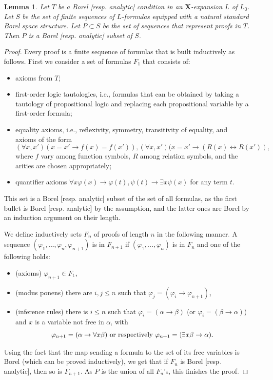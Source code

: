 \documentclass[12pt]{amsart}
\newtheorem{lemma}[theorem]{Lemma}
\begin{document}
\begin{lemma}\label{lemma:set_of_proofs_is_Borel}
    Let $T$ be a Borel [resp. analytic] condition in an $\mathbf{X}$-expansion $L$ of $L_0$. Let $S$ be the set of finite sequences of $L$-formulas equipped with a natural standard Borel space structure. Let $P \subset S$ be the set of sequences that represent proofs in $T$. Then $P$ is a Borel [resp. analytic] subset of $S$.
\end{lemma}
\begin{proof}
    Every proof is a finite sequence of formulas that is built inductively as follows. First we consider a set of formulas $F_1$ that consists of:
    \begin{itemize}
        \item axioms from $T$;
        \item first-order logic tautologies, i.e., formulas that can be obtained by taking a tautology of propositional logic and replacing each propositional variable by a first-order formula;
        \item equality axioms, i.e., reflexivity, symmetry, transitivity of equality, and axioms of the form 
        \[ (\forall x,x')(x=x' \rightarrow f(x)=f(x')), (\forall x,x')(x=x' \rightarrow (R(x) \leftrightarrow R(x')),\]
        where $f$ vary among function symbols, $R$ among relation symbols, and the arities are chosen appropriately;
        \item quantifier axioms $\forall x \varphi(x) \rightarrow \varphi(t), \psi(t) \rightarrow \exists x \psi(x)$ for any term $t$.
    \end{itemize}
    This set is a Borel [resp. analytic] subset of the set of all formulas, as the first bullet is Borel [resp. analytic] by the assumption, and the latter ones are Borel by an induction argument on their length.
  
    We define inductively sets $F_n$ of proofs of length $n$ in the following manner. A sequence $(\varphi_1, \dots, \varphi_n, \varphi_{n+1})$ is in $F_{n+1}$ if $(\varphi_1, \dots, \varphi_n)$ is in $F_n$ and one of the following holds:
    \begin{itemize}
        \item (axioms) $\varphi_{n+1} \in F_1$,
        \item (modus ponens) there are $i, j \leq n$ such that $\varphi_j = (\varphi_i \rightarrow \varphi_{n+1})$,
        \item (inference rules) there is $i \leq n$ such that $\varphi_i = (\alpha \rightarrow \beta)$ (or $\varphi_i = (\beta \rightarrow \alpha)$) and $x$ is a variable not free in $\alpha$, with 
        \[ \varphi_{n+1} = (\alpha \rightarrow \forall x \beta) \textnormal{ or respectively } \varphi_{n+1} = (\exists x \beta \rightarrow \alpha). \]
    \end{itemize}
    Using the fact that the map sending a formula to the set of its free variables is Borel (which can be proved inductively), we get that if $F_n$ is Borel [resp. analytic], then so is $F_{n+1}$. As $P$ is the union of all $F_n$'s, this finishes the proof.
\end{proof}
\end{document}
